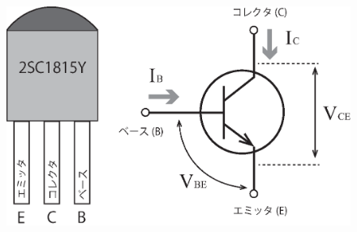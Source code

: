 \documentclass[uplatex,a4paper,11pt,oneside,openany]{jsbook}
\begin{document}
\begin{figure}[H]
	\centering
	\includegraphics[keepaspectratio, scale=0.6, angle=0]
	{figs/eps/illust.eps}
	\label{fig:illust}
\end{figure}

\newpage
\end{document}
